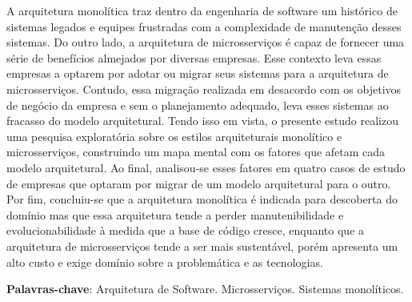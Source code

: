 \begin{resumo}
    A arquitetura monolítica traz dentro da engenharia de software um histórico de sistemas legados e
    equipes frustradas com a complexidade de manutenção desses sistemas. Do outro lado, a arquitetura
    de microsserviços é capaz de fornecer uma série de benefícios almejados por diversas empresas.
    Esse contexto leva essas empresas a optarem por adotar ou migrar seus sistemas para a
    arquitetura de microsserviços. Contudo, essa migração realizada em desacordo com os objetivos de
    negócio da empresa e sem o planejamento adequado, leva esses sistemas ao fracasso do modelo
    arquitetural. Tendo isso em vista, o presente estudo realizou uma pesquisa exploratória sobre os
    estilos arquiteturais monolítico e microsserviços, construindo um mapa mental com os fatores que
    afetam cada modelo arquitetural. Ao final, analisou-se esses fatores em quatro casos de estudo de
    empresas que optaram por migrar de um modelo arquitetural para o outro. Por fim, concluiu-se que
    a arquitetura monolítica é indicada para descoberta do domínio mas que essa arquitetura tende a
    perder manutenibilidade e evolucionabilidade à medida que a base de código cresce, enquanto que
    a arquitetura de microsserviços tende a ser mais sustentável, porém apresenta um alto custo e
    exige domínio sobre a problemática e as tecnologias.
 \vspace{\onelineskip}
    
 \noindent
  \textbf{Palavras-chave}: Arquitetura de Software. Microsserviços. Sistemas monolíticos.
\end{resumo}
